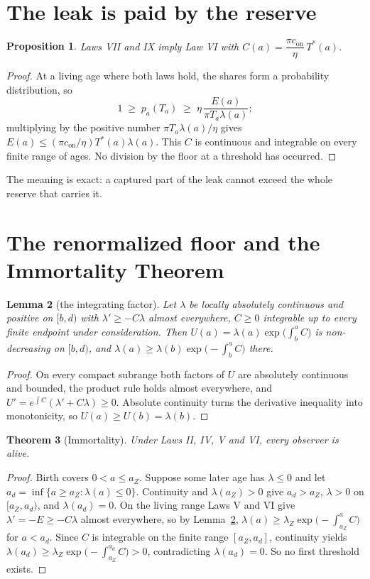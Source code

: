 \documentclass[11pt]{article}
\newtheorem{theorem}{Theorem}[section]
\newtheorem{lemma}[theorem]{Lemma}
\newtheorem{proposition}[theorem]{Proposition}
\theoremstyle{definition}
\theoremstyle{remark}
\newcommand{\Tst}{T^{*}}
\newcommand{\lamZ}{\lambda_{Z}}
\newcommand{\con}{c_{\mathrm{on}}}
\begin{document}
\section{The leak is paid by the reserve}

\begin{proposition}\label{prop:leak}
Laws VII and IX imply Law VI with $C(a)=\dfrac{\pi\con}{\eta}\,\Tst(a)$.
\end{proposition}

\begin{proof}
At a living age where both laws hold, the shares form a probability distribution, so
\[
1\;\ge\;p_a(T_a)\;\ge\;\eta\,\frac{E(a)}{\pi T_a\lambda(a)} ;
\]
multiplying by the positive number $\pi T_a\lambda(a)/\eta$ gives $E(a)\le(\pi\con/\eta)\Tst(a)\lambda(a)$. This $C$ is continuous and integrable on every finite range of ages. No division by the floor at a threshold has occurred.
\end{proof}

The meaning is exact: a captured part of the leak cannot exceed the whole reserve that carries it.

\section{The renormalized floor and the Immortality Theorem}

\begin{lemma}[the integrating factor]\label{lem:renorm}
Let $\lambda$ be locally absolutely continuous and positive on $[b,d)$ with $\lambda'\ge-C\lambda$ almost everywhere, $C\ge0$ integrable up to every finite endpoint under consideration. Then $U(a)=\lambda(a)\exp\big(\int_b^aC\big)$ is non-decreasing on $[b,d)$, and $\lambda(a)\ge\lambda(b)\exp\big(-\int_b^aC\big)$ there.
\end{lemma}

\begin{proof}
On every compact subrange both factors of $U$ are absolutely continuous and bounded, the product rule holds almost everywhere, and $U'=e^{\int C}(\lambda'+C\lambda)\ge0$. Absolute continuity turns the derivative inequality into monotonicity, so $U(a)\ge U(b)=\lambda(b)$.
\end{proof}

\begin{theorem}[Immortality]\label{thm:immortal}
Under Laws II, IV, V and VI, every observer is alive.
\end{theorem}

\begin{proof}
Birth covers $0<a\le a_Z$. Suppose some later age has $\lambda\le0$ and let $a_d=\inf\{a\ge a_Z:\lambda(a)\le0\}$. Continuity and $\lambda(a_Z)>0$ give $a_d>a_Z$, $\lambda>0$ on $[a_Z,a_d)$, and $\lambda(a_d)=0$. On the living range Laws V and VI give $\lambda'=-E\ge-C\lambda$ almost everywhere, so by Lemma~\ref{lem:renorm}, $\lambda(a)\ge\lamZ\exp\big(-\int_{a_Z}^aC\big)$ for $a<a_d$. Since $C$ is integrable on the finite range $[a_Z,a_d]$, continuity yields $\lambda(a_d)\ge\lamZ\exp\big(-\int_{a_Z}^{a_d}C\big)>0$, contradicting $\lambda(a_d)=0$. So no first threshold exists.
\end{proof}
\end{document}
